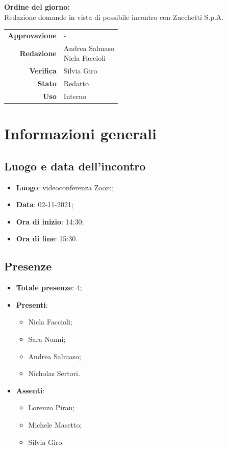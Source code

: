 \documentclass[11pt]{article}
\begin{document}
\begin{titlepage}
\begin{center}
			\large
			
			\vfill
			\textbf{Ordine del giorno:} \\
			Redazione domande in vista di possibile incontro con Zucchetti S.p.A.
			\vfill
			
			\begin{tabular}{r|l}
				\textbf{Approvazione} &  -\\
				\textbf{Redazione} &  \parbox[t]{3.5cm}{Andrea Salmaso \\Nicla Faccioli}\\
				\textbf{Verifica} &  Silvia Giro\\
				\textbf{Stato} & Redatto \\
				\textbf{Uso} & Interno
			\end{tabular}
			\vfill
			
		\end{center}
	\end{titlepage}

	\newpage

	\section{Informazioni generali}
	\subsection{Luogo e data dell'incontro}
	\begin{itemize}
		\item \textbf{Luogo}: videoconferenza Zoom;
		\item \textbf{Data}: 02-11-2021;
		\item \textbf{Ora di inizio}: 14:30;
		\item \textbf{Ora di fine}: 15:30.
	\end{itemize}
	
	\subsection{Presenze}
	\begin{itemize}
		\item \textbf{Totale presenze}: 4;
		\item \textbf{Presenti}:
		\begin{itemize}
			\item Nicla Faccioli;
			\item Sara Nanni;
			\item Andrea Salmaso;
			\item Nicholas Sertori.
		\end{itemize}
		\item \textbf{Assenti}:
		\begin{itemize}
			\item Lorenzo Piran;
			\item Michele Masetto;
			\item Silvia Giro.
		\end{itemize}
	\end{itemize}
\end{document}
